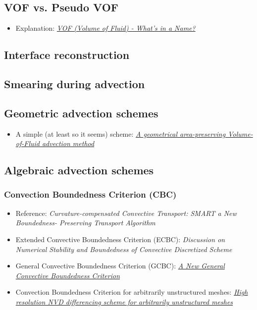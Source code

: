\subsection{VOF vs. Pseudo VOF}

\begin{itemize}
    \item Explanation: \textit{\href{http://www.flow3d.com/cfd-101/cfd-101-VOF.html}{VOF (Volume of Fluid) - What's in a Name?}}
\end{itemize}

\subsection{Interface reconstruction}

\subsection{Smearing during advection}

\subsection{Geometric advection schemes}

\begin{itemize}
    \item A simple (at least so it seems) scheme: \textit{\href{http://www.lmm.jussieu.fr/~zaleski/nota02.pdf}{A geometrical area-preserving Volume-of-Fluid advection method}}
\end{itemize}

\subsection{Algebraic advection schemes}

\subsubsection{Convection Boundedness Criterion (CBC)}

\sloppy
\begin{itemize}
    \item Reference: \textit{Curvature-compensated Convective Transport: SMART a New Boundedness- Preserving Transport Algorithm}
    \item Extended Convective Boundedness Criterion (ECBC): \textit{Discussion on Numerical Stability and Boundedness of Convective Discretized Scheme}
    \item General Convective Boundedness Criterion (GCBC): \textit{\href{http://gr.xjtu.edu.cn:8080/upload/PUB.1673.4/Wei_NHT.pdf}{A New General Convective Boundedness Criterion}}
    \item Convection Boundedness Criterion for arbitrarily unstructured meshes: \textit{\href{http://powerlab.fsb.hr/ped/kturbo/openfoam/papers/GammaPaper.pdf}{High resolution NVD differencing scheme for arbitrarily unstructured meshes}}
\end{itemize}
\fussy

